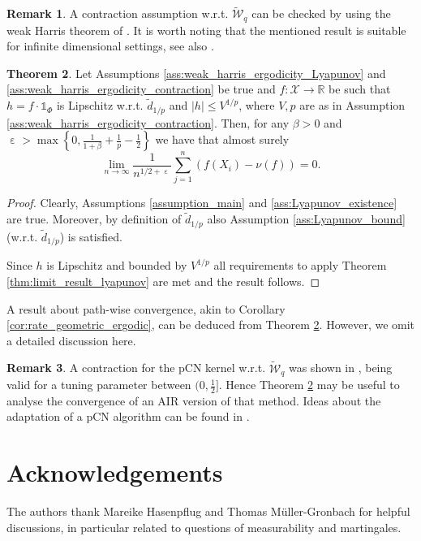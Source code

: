 \documentclass[12pt]{article}
\theoremstyle{definition}
\newtheorem{thm}{Theorem}[section]
\newtheorem{rem}[thm]{Remark}
\newcommand{\R}{\mathbb{R}}
\newcommand{\cX}{\mathcal{X}}
\DeclareMathOperator{\eps}{\varepsilon}
\begin{document}
\begin{rem}
	A contraction assumption w.r.t. $\widetilde{\mathcal{W}}_q$ can be checked by using the weak Harris theorem of \cite{hairer2011asymptotic}.
	It is worth noting that the mentioned result is suitable for infinite dimensional settings, see also \cite{hairer2014spectralgaps,hosseini2023spectral}. 
\end{rem}

\begin{thm}\label{thm:weak_harris_ergodic_limit_theorem}
	Let Assumptions \ref{ass:weak_harris_ergodicity_Lyapunov} and \ref{ass:weak_harris_ergodicity_contraction} be true and $f \colon \cX \to \R$ be such that $h = f \cdot \mathds{1}_{\Phi}$ is Lipschitz w.r.t. $\widetilde{d}_{1/p}$  and $\vert h \vert\le V^{1/p}$, where $V,p $ are as in Assumption \ref{ass:weak_harris_ergodicity_contraction}.
	Then, for any $\beta>0$ and $\eps> \max\left\{0, \frac{1}{1+\beta} + \frac{1}{p} - \frac{1}{2}\right\}$ we have that almost surely
	\[
	\lim_{n \to \infty} \frac{1}{n^{1/2+\eps}} \sum_{j=1}^n \left( f(X_i) - \nu(f) \right) =0.
	\]
\end{thm}
\begin{proof}
	Clearly, Assumptions \ref{assumption_main} and \ref{ass:Lyapunov_existence} are true.
	Moreover, by definition of $\widetilde{d}_{1/p}$ also Assumption \ref{ass:Lyapunov_bound} (w.r.t. $\widetilde{d}_{1/p}$) is satisfied. 
	
	Since $h$ is Lipschitz and bounded by $V^{1/p}$ all requirements to apply Theorem \ref{thm:limit_result_lyapunov} are met and the result follows. 
\end{proof}

A result about path-wise convergence, akin to Corollary \ref{cor:rate_geometric_ergodic}, can be deduced from Theorem \ref{thm:weak_harris_ergodic_limit_theorem}. However, we omit a detailed discussion here.

\begin{rem}
	A contraction for the pCN kernel w.r.t. $\widetilde{\mathcal{W}}_q$ was shown in \cite{hairer2014spectralgaps}, being valid for a tuning parameter between $(0,\frac{1}{2}]$.
	Hence Theorem \ref{thm:weak_harris_ergodic_limit_theorem} may be useful to analyse the convergence of an AIR version of that method. 
	Ideas about the adaptation of a pCN algorithm can be found in \cite{LAW2014127,HU2017492,rudolf2018generalization}.
\end{rem}

\section*{Acknowledgements}
The authors thank Mareike Hasenpflug and Thomas M\"uller-Gronbach for helpful discussions, in particular related to questions of measurability and martingales. 
\end{document}
